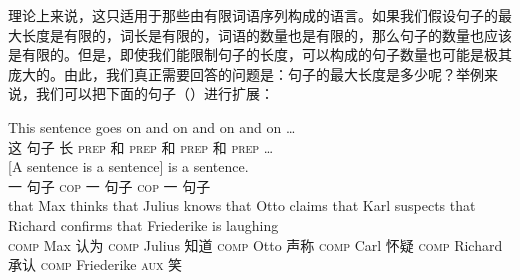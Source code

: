 理论上来说，这只适用于那些由有限词语序列构成的语言。如果我们假设句子的最大长度是有限的，词长是有限的，词语的数量也是有限的，那么句子的数量也应该是有限的。但是，即使我们能限制句子的长度，可以构成的句子数量也可能是极其庞大的。由此，我们真正需要回答的问题是：句子的最大长度是多少呢？举例来说，我们可以把下面的句子（）进行扩展：

\eal 
\ex 
\gll This sentence goes on and on and on and on \ldots \\
       这 句子 长 \textsc{prep} 和 \textsc{prep} 和 \textsc{prep} 和 \textsc{prep} \ldots \\
\ex
\gll  {}[A sentence is a sentence] is a sentence. \\
      {}一 句子 \textsc{cop} 一 句子 \textsc{cop} 一 句子\\
\ex\label{einbettung-dass-Saetze}
\gll that Max thinks that Julius knows that Otto claims that Karl suspects that Richard confirms that Friederike is laughing\\
      \textsc{comp} Max 认为 \textsc{comp} Julius 知道 \textsc{comp} Otto 声称 \textsc{comp} Carl 怀疑 \textsc{comp} Richard 承认 \textsc{comp} Friederike \textsc{aux} 笑\\
\zl

